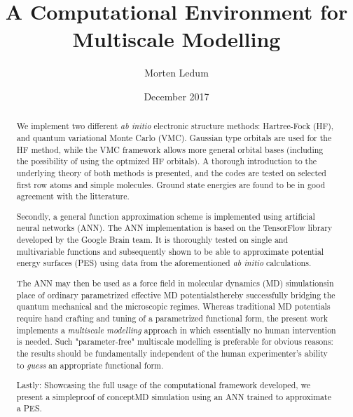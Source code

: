 \documentclass[twoside,english]{uiofysmaster}
\author{Morten Ledum}
\title{A Computational Environment for Multiscale Modelling}
\date{December 2017}
\begin{document}
\newcommand{\mainfile}{}
\maketitle

\begin{abstract}
We implement two different \emph{ab initio} electronic structure methods: Hartree-Fock (HF), and quantum variational Monte Carlo (VMC). Gaussian type orbitals are used for the HF method, while the VMC framework allows more general orbital bases (including the possibility of using the optmized HF orbitals). A thorough introduction to the underlying theory of both methods is presented, and the codes are tested on selected first row atoms and simple molecules. Ground state energies are found to be in good agreement with the litterature. 

Secondly, a general function approximation scheme is implemented using artificial neural networks (ANN). The ANN implementation is based on the TensorFlow library developed by the Google Brain team. It is thoroughly tested on single and multivariable functions and subsequently shown to be able to approximate potential energy surfaces (PES) using data from the aforementioned \emph{ab initio} calculations.

The ANN may then be used as a force field in molecular dynamics (MD) simulations\textemdash in place of ordinary parametrized effective MD potentials\textemdash thereby successfully bridging the quantum mechanical and the microscopic regimes. Whereas traditional MD potentials require hand crafting and tuning of a parametrized functional form, the present work implements a \emph{multiscale modelling} approach in which essentially no human intervention is needed. Such "parameter-free" multiscale modelling is preferable for obvious reasons: the results should be fundamentally independent of the human experimenter's ability to \emph{guess} an appropriate functional form.

Lastly: Showcasing the full usage of the computational framework developed, we present a simple\textemdash proof of concept\textemdash MD simulation using an ANN trained to approximate a PES. 

\end{abstract}
\end{document}
